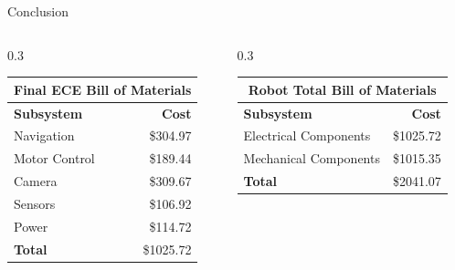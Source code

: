 \documentclass[final]{beamer}
\newlength{\colwidth}
\begin{document}
\begin{frame}[t]
\begin{columns}[t]
\begin{column}{\colwidth}
\begin{block}{Conclusion}
\begin{columns}[t]
    
    \begin{column}{0.3\colwidth}
      \begin{table}[ht]
        \begin{center}
          \label{tab:table1}
          \begin{tabular}{l|r} %
            \toprule
            \multicolumn{2}{c}{\textbf{Final ECE Bill of Materials}} \\
            \midrule
            \cellcolor{white}\textbf{Subsystem} & \cellcolor{white}\textbf{Cost} \\
            \midrule
            Navigation & \$304.97 \\
            Motor Control & \$189.44 \\
            Camera & \$309.67 \\
            Sensors & \$106.92 \\
            Power & \$114.72 \\
            \cellcolor{white}\textbf{Total} & \cellcolor{white}\$1025.72 \\
            \bottomrule
          \end{tabular}
        \end{center}
      \end{table}    
    \end{column}


    \begin{column}{0.3\colwidth}
      \begin{table}[ht]
        \begin{center}
          \label{tab:table1}
          \begin{tabular}{l|r} %
            \toprule
            \multicolumn{2}{c}{\textbf{Robot Total Bill of Materials}} \\
            \midrule
            \cellcolor{white}\textbf{Subsystem} & \cellcolor{white}\textbf{Cost} \\
            \midrule
            Electrical Components & \$1025.72 \\
            Mechanical Components & \$1015.35 \\
            \cellcolor{white}\textbf{Total} & \cellcolor{white}\$2041.07 \\
            \bottomrule
          \end{tabular}
        \end{center}
      \end{table}    
    \end{column}



\end{columns}
\end{block}
\end{column}
\end{columns}
\end{frame}
\end{document}
